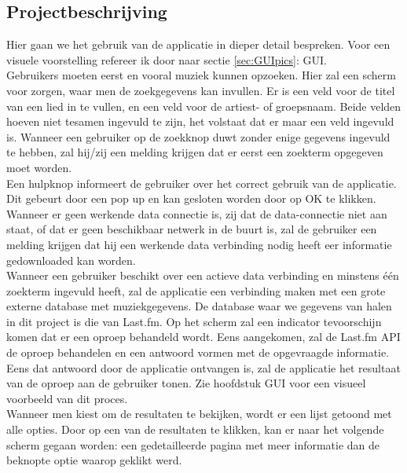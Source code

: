 \documentclass[11pt,a4paper]{article}
\begin{document}
	\subsection{Projectbeschrijving}
	\label{sec:Projectbeschrijving}
Hier gaan we het gebruik van de applicatie in dieper detail bespreken. Voor een visuele voorstelling refereer ik door naar sectie \ref{sec:GUIpics}: GUI.
\\
Gebruikers moeten eerst en vooral muziek kunnen opzoeken. Hier zal een scherm voor zorgen, waar men de zoekgegevens kan invullen. Er is een veld voor de titel van een lied in te vullen, en een veld voor de artiest- of groepsnaam. Beide velden hoeven niet tesamen ingevuld te zijn, het volstaat dat er maar een veld ingevuld is. Wanneer een gebruiker op de zoekknop duwt zonder enige gegevens ingevuld te hebben, zal hij/zij een melding krijgen dat er eerst een zoekterm opgegeven moet worden.
\\ 

Een hulpknop informeert de gebruiker over het correct gebruik van de applicatie. Dit gebeurt door een pop up en kan gesloten worden door op OK te klikken. 
\\ 
 
Wanneer er geen werkende data connectie is, zij dat de data-connectie niet aan staat, of dat er geen beschikbaar netwerk in de buurt is, zal de gebruiker een melding krijgen dat hij een werkende data verbinding nodig heeft eer informatie gedownloaded kan worden. 
\\ 
	
Wanneer een gebruiker beschikt over een actieve data verbinding en minstens één zoekterm ingevuld heeft, zal de applicatie een verbinding maken met een grote externe database met muziekgegevens. De  database waar we gegevens van halen in dit project is die van Last.fm. Op het scherm zal een indicator tevoorschijn komen dat er een oproep behandeld wordt. Eens aangekomen, zal de Last.fm API de oproep behandelen en een antwoord vormen met de opgevraagde informatie. Eens dat antwoord door de applicatie ontvangen is, zal de applicatie het resultaat van de oproep aan de gebruiker tonen. Zie hoofdstuk GUI voor een visueel voorbeeld van dit proces. 
\\ 
	
Wanneer men kiest om de resultaten te bekijken, wordt er een lijst getoond met alle opties. Door op een van de resultaten te klikken, kan er naar het volgende scherm gegaan worden: een gedetailleerde pagina met meer informatie dan de beknopte optie waarop geklikt werd. 
\\ 
	
\end{document}
